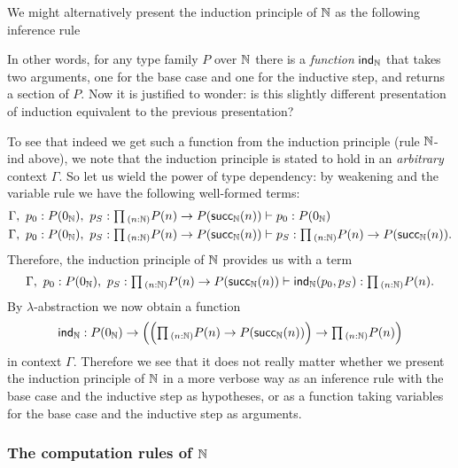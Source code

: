 \begin{rmk}
  We might alternatively present the induction principle of $\N$ as the following inference rule
  \begin{prooftree}
  \end{prooftree}
  In other words, for any type family $P$ over $\N$ there is a \emph{function} $\ind{\N}$ that takes two arguments, one for the base case and one for the inductive step, and returns a section of $P$. Now it is justified to wonder: is this slightly different presentation of induction equivalent to the previous presentation?
  
  To see that indeed we get such a function from the induction principle (rule $\N$-ind above), we note that the induction principle is stated to hold in an \emph{arbitrary} context $\Gamma$. So let us wield the power of type dependency: by weakening and the variable rule we have the following well-formed terms:
  \begin{align*}
    \Gamma,~p_0:P(\zeroN),~p_S:\prd{n:\N}P(n)\to P(\succN(n)) & \vdash p_0 : P(\zeroN) \\
    \Gamma,~p_0:P(\zeroN),~p_S:\prd{n:\N}P(n)\to P(\succN(n)) & \vdash p_S : \prd{n:\N}P(n)\to P(\succN(n)).
  \end{align*}
  Therefore, the induction principle of $\N$ provides us with a term
  \begin{equation*}
    \Gamma,~p_0:P(\zeroN),~p_S:\prd{n:\N}P(n)\to P(\succN(n)) \vdash \indN(p_0,p_S) : \prd{n:\N}P(n).
  \end{equation*}
  By $\lambda$-abstraction we now obtain a function
  \begin{equation*}
    \indN : P(\zeroN)\to \Big(\Big(\prd{n:\N}P(n)\to P(\succN(n))\Big) \to \prd{n:\N}P(n)\Big)
  \end{equation*}
  in context $\Gamma$. Therefore we see that it does not really matter whether we present the induction principle of $\N$ in a more verbose way as an inference rule with the base case and the inductive step as hypotheses, or as a function taking variables for the base case and the inductive step as arguments.
\end{rmk}

\subsubsection{The computation rules of $\N$}

